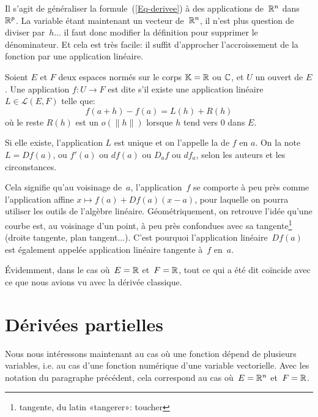 Il s'agit de généraliser la formule~(\ref{Eq-derivee}) à des applications de~$\mathbb R^n$ dans~$\mathbb R^p$. La variable étant maintenant un vecteur de~$\mathbb R^n $, il n'est plus question de diviser par~$h$... il faut donc modifier la définition pour supprimer le dénominateur. Et cela est très facile: il suffit d'approcher l'accroissement de la fonction par une application linéaire.
\begin{definition}[Différentielle]
Soient $E$ et $F$ deux espaces normés sur le corps $\mathbb K=\mathbb R$ ou $\mathbb C$, et $U$ un ouvert de $E$. Une application $f: U\rightarrow F$ est dite  s'il existe une application linéaire $L\in\mathcal{L}(E,F)$ telle que:
\begin{equation}\label{Eq-Differentielle}
f(a+h)-f(a)=L(h)+R(h)
\end{equation}
où le reste $R(h)$ est un $o(\|h\|)$ lorsque $h$ tend vers $0$ dans $E$.

\medskip
Si elle existe, l'application $L$ est unique et on l'appelle la  de $f$ en $a$.
On la note $L=Df(a)$, ou $f'(a)$ ou $df(a)$ ou $D_af$ ou $df_a$, selon les auteurs et les circonstances.
\end{definition}
 Cela signifie qu'au voisinage de~$a$, l'application~$f$ se comporte à peu près comme l'application affine $x\mapsto f(a)+Df(a)(x-a)$, pour laquelle on pourra utiliser les outils de l'algèbre linéaire. Géométriquement, on retrouve l'idée qu'une courbe est, au voisinage d'un point, à peu près confondues avec sa tangente\footnote{tangente, du latin «tangerer»: toucher} (droite tangente, plan tangent...). C'est pourquoi l'application linéaire~$Df(a)$ est également appelée application linéaire tangente à~$f$ en~$a$.

\medskip
Évidemment, dans le cas où~$E=\mathbb R$ et~$F=\mathbb R$, tout ce qui a été dit coïncide avec ce que nous avions vu avec la dérivée classique.

\medskip
\section{Dérivées partielles}

Nous nous intéressons maintenant au cas où une fonction dépend de plusieurs variables, i.e. au cas d'une fonction numérique d'une variable vectorielle. Avec les notation du paragraphe précédent, cela correspond au cas où~$E=\mathbb R^n$ et~$F=\mathbb R$.


